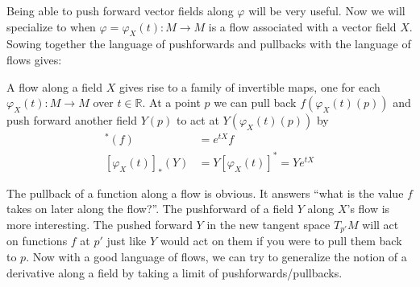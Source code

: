 		Being able to push forward vector fields along $\varphi$ will be very useful. Now we will specialize to when $\varphi = \varphi_X(t): M \rightarrow M$ is a flow associated with a vector field $X$. Sowing together the language of pushforwards and pullbacks with the language of flows gives:
		\begin{obs}
			A flow along a field $X$ gives rise to a family of invertible maps, one for each $\varphi_X(t): M \rightarrow M$ over $t \in \mathbb R$. At a point $p$ we can pull back $f(\varphi_X(t)(p))$ and push forward another field $Y(p)$ to act at $Y(\varphi_X(t)(p))$ by
			\begin{align}
				[\varphi_X (t)]^* (f) &= e^{t X} f  \\
				[\varphi_X (t)]_* (Y) &= Y [\varphi_X (t)]^*  = Y e^{tX}
			\end{align}
		\end{obs}
		The pullback of a function along a flow is obvious. It answers ``what is the value $f$ takes on later along the flow?''. The pushforward of a field $Y$ along $X$'s flow is more interesting. The pushed forward $Y$ in the new tangent space $T_{p'} M$ will act on functions $f$ at $p'$ just like $Y$ would act on them if you were to pull them back to $p$. Now with a good language of flows, we can try to generalize the notion of a derivative along a field by taking a limit of pushforwards/pullbacks. \\
		
		
		
		
